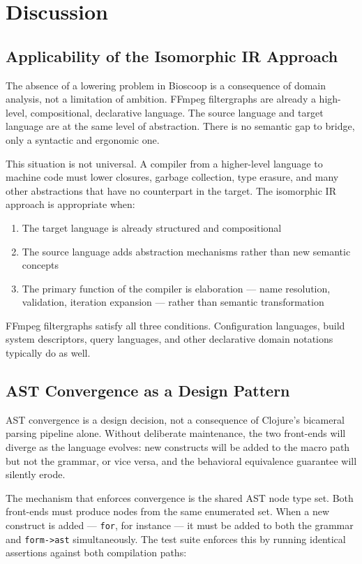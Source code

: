 \documentclass[conference]{IEEEtran}
\begin{document}
\section{Discussion}

\subsection{Applicability of the Isomorphic IR Approach}

The absence of a lowering problem in Bioscoop is a consequence of domain analysis, not a limitation of ambition. FFmpeg filtergraphs are already a high-level, compositional, declarative language. The source language and target language are at the same level of abstraction. There is no semantic gap to bridge, only a syntactic and ergonomic one.

This situation is not universal. A compiler from a higher-level language to machine code must lower closures, garbage collection, type erasure, and many other abstractions that have no counterpart in the target. The isomorphic IR approach is appropriate when:

\begin{enumerate}
\item The target language is already structured and compositional
\item The source language adds abstraction mechanisms rather than new semantic concepts
\item The primary function of the compiler is elaboration --- name resolution, validation, iteration expansion --- rather than semantic transformation
\end{enumerate}

FFmpeg filtergraphs satisfy all three conditions. Configuration languages, build system descriptors, query languages, and other declarative domain notations typically do as well.

\subsection{AST Convergence as a Design Pattern}

AST convergence is a design decision, not a consequence of Clojure's bicameral parsing pipeline alone. Without deliberate maintenance, the two front-ends will diverge as the language evolves: new constructs will be added to the macro path but not the grammar, or vice versa, and the behavioral equivalence guarantee will silently erode.

The mechanism that enforces convergence is the shared AST node type set. Both front-ends must produce nodes from the same enumerated set. When a new construct is added --- \texttt{for}, for instance --- it must be added to both the grammar and \texttt{form->ast} simultaneously. The test suite enforces this by running identical assertions against both compilation paths:
\end{document}
